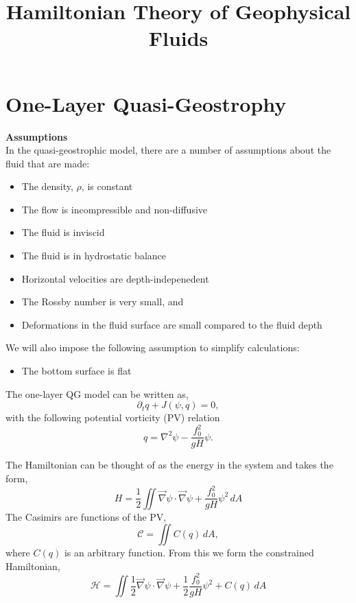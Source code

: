 \documentclass[12pt]{article}
\begin{document}
\title{Hamiltonian Theory of Geophysical Fluids}

\section{One-Layer Quasi-Geostrophy}
  \textbf{Assumptions} \\
  In the quasi-geostrophic model, there are a number of assumptions about the fluid that are made:
  \begin{itemize}
    \item The density, $\rho$, is constant
    \item The flow is incompressible and non-diffusive
    \item The fluid is inviscid
    \item The fluid is in hydrostatic balance
    \item Horizontal velocities are depth-indepenedent
    \item The Rossby number is very small, and
    \item Deformations in the fluid surface are small compared to the fluid depth
  \end{itemize}
  We will also impose the following assumption to simplify calculations:
  \begin{itemize}
    \item The bottom surface is flat
  \end{itemize}

  The one-layer QG model can be written as,
  $$
  \partial_t q + J(\psi, q) = 0,
  $$
  with the following potential vorticity (PV) relation
  $$
  q = \nabla^2 \psi - \frac{f_0^2}{gH} \psi.
  $$
  
  The Hamiltonian can be thought of as the energy in the system and takes the form,
  $$
  H =  \frac12 \iint \vec\nabla\psi \cdot \vec\nabla\psi + \frac{f_0^2}{g H} \psi^2 \, dA
  $$
  The Casimirs are functions of the PV,
  $$
  \mathcal{C} = \iint C(q) \, dA,
  $$
  where $C(q)$ is an arbitrary function. From this we form the constrained Hamiltonian,
  \begin{equation}
    \mathcal{H} = \iint  \frac12 \vec\nabla\psi \cdot \vec\nabla\psi + \frac12 \frac{f_0^2}{g H} \psi^2 + C(q) \, dA
    \label{eqn:qg_ol_h}
  \end{equation}

\end{document}
